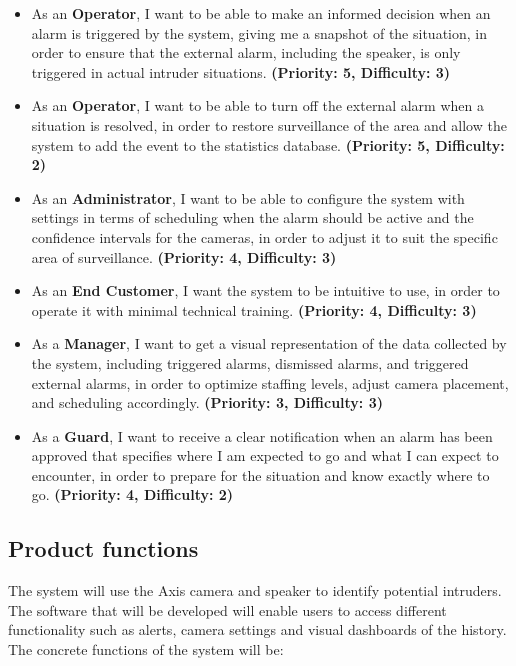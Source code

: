 \documentclass{article}
\begin{document}
 \begin{itemize}
    \item As an \textbf{Operator}, I want to be able to make an informed decision when an alarm is triggered by the system, giving me a snapshot of the situation, in order to ensure that the external alarm, including the speaker, is only triggered in actual intruder situations. \textbf{(Priority: 5, Difficulty: 3)}
    
    \item As an \textbf{Operator}, I want to be able to turn off the external alarm when a situation is resolved, in order to restore surveillance of the area and allow the system to add the event to the statistics database. \textbf{(Priority: 5, Difficulty: 2)}
    
    \item As an \textbf{Administrator}, I want to be able to configure the system with settings in terms of scheduling when the alarm should be active and the confidence intervals for the cameras, in order to adjust it to suit the specific area of surveillance. \textbf{(Priority: 4, Difficulty: 3)}
    
    \item As an \textbf{End Customer}, I want the system to be intuitive to use, in order to operate it with minimal technical training. \textbf{(Priority: 4, Difficulty: 3)}
    
    \item As a \textbf{Manager}, I want to get a visual representation of the data collected by the system, including triggered alarms, dismissed alarms, and triggered external alarms, in order to optimize staffing levels, adjust camera placement, and scheduling accordingly. \textbf{(Priority: 3, Difficulty: 3)}
    
    \item As a \textbf{Guard}, I want to receive a clear notification when an alarm has been approved that specifies where I am expected to go and what I can expect to encounter, in order to prepare for the situation and know exactly where to go. \textbf{(Priority: 4, Difficulty: 2)}
\end{itemize}


\subsection{Product functions}
The system will use the Axis camera and speaker to identify potential intruders. The software that will be developed will enable users to access different functionality such as alerts, camera settings and visual dashboards of the history. The concrete functions of the system will be: 
\end{document}
